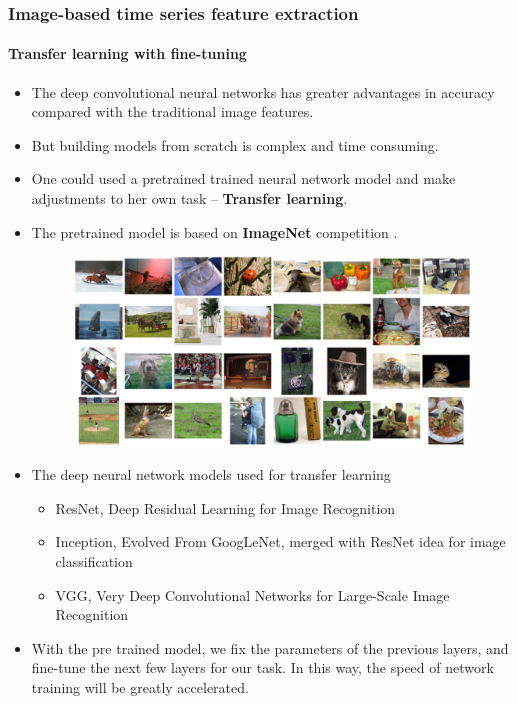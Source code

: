 \documentclass[10pt,aspectratio=43]{beamer}
\begin{document}
\begin{frame}[allowframebreaks]
  \frametitle{Image-based time series feature extraction}
  \framesubtitle{Transfer learning with fine-tuning}

  \begin{itemize}
  \item The deep convolutional neural networks has greater advantages in accuracy compared
    with the traditional image features.

  \item But building models from scratch is complex and time consuming.

  \item One could used a pretrained trained neural network model and make adjustments to
    her own task -- \textbf{Transfer learning}.

  \item The pretrained model is based on \textbf{ImageNet} competition \citep{Deng2009ImageNet}.
    \begin{figure}
      \centering
      \includegraphics[width=0.9\linewidth]{figures/Sample-ImagesNet}
    \end{figure}

  \item The deep neural network models used for transfer learning

    \begin{itemize}
    \item ResNet\citep{Szegedy2016Inception}, Deep Residual Learning for Image Recognition
    \item Inception\citep{Szegedy2016Rethinking}, Evolved From GoogLeNet, merged with ResNet idea for image classification
    \item VGG\citep{Simonyan2014Very}, Very Deep Convolutional Networks for Large-Scale Image Recognition
    \end{itemize}


  \item With the pre trained model, we fix the parameters of the previous layers, and
    fine-tune the next few layers for our task. In this way, the speed of network training
    will be greatly accelerated.

  \end{itemize}
\end{frame}
\end{document}

